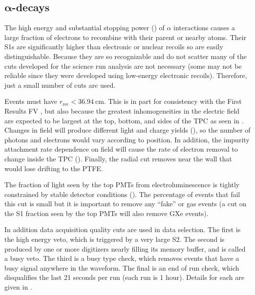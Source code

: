 \subsection[$\alpha$-decays][$\alpha$-decays]{$\mathbf{\alpha}$-decays}
\label{subsec:electron_lifetimes_measurement_alphas}
The high energy and substantial stopping power () of $\alpha$ interactions causes a large fraction of
electrons to recombine with their parent or nearby  atoms.  Their S1s are significantly higher than electronic or nuclear recoils
so are
easily distinguishable.  Because they are so recognizable and do not scatter many of the cuts developed for the science run analysis are
not necessary (some may not be reliable since they were developed using low-energy electronic recoils).  Therefore, just a small
number of cuts are used.

Events must have $r_{\mathrm{rec}} < 36.94\ \mathrm{cm}$.  This is in part for consistency with the First Results FV
, but also because the greatest inhomogeneities in the electric field are expected to be largest at the top,
bottom, and
sides of the TPC as seen in .  Changes in field will produce different light and charge yields
(), so the number of photons and electrons would vary according to position.  In addition, the impurity
attachment rate dependence on field will cause the rate of electron removal to change inside the TPC
().  Finally, the radial cut removes \alphadecays near the wall that would lose drifting
\electron to the PTFE.

The fraction of light seen by the top PMTs from electroluminescence is tightly constrained by stable detector conditions
().  The percentage of events that fail this cut is small but it is important to remove any
``fake'' or gas events (a cut on the S1 fraction seen by the top PMTs will also remove GXe events).

In addition data acquisition quality cuts are used in data selection.  The first is the high energy veto, which is triggered by a very
large S2.  The second is produced by one or more digitizers nearly filling its memory buffer, and is called a busy veto.  The third is
a busy type check, which removes events that have a busy signal anywhere in the waveform.  The final is an end of run check, which
disqualifies the last 21 seconds per run (each run is 1 hour).  Details for each are given in .

